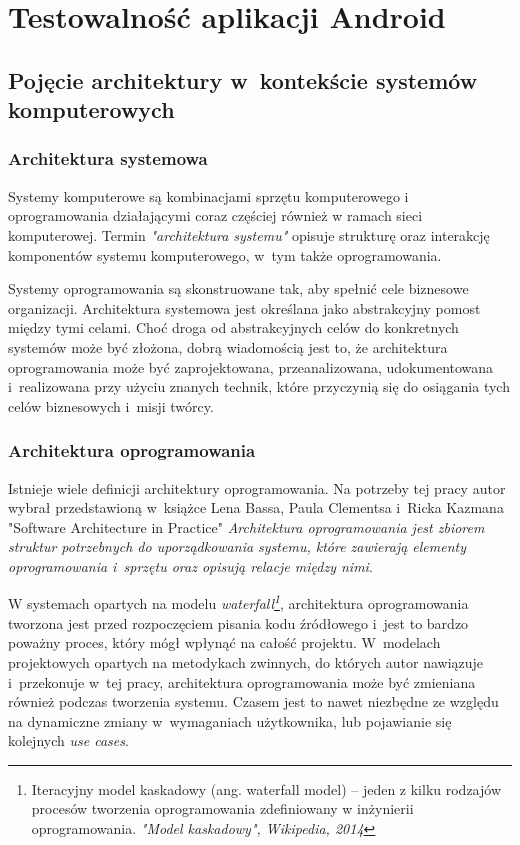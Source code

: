 \chapter{Testowalność aplikacji Android}
\label{opis_problemu}

\section{Pojęcie architektury w~kontekście systemów \newline komputerowych}
\subsection{Architektura systemowa}
Systemy komputerowe są kombinacjami sprzętu komputerowego i oprogramowania działającymi coraz częściej również w ramach sieci komputerowej. Termin \textit{"architektura systemu"} opisuje strukturę oraz interakcję komponentów systemu komputerowego, w~tym także oprogramowania.

Systemy oprogramowania są skonstruowane tak, aby spełnić cele biznesowe organizacji. Architektura systemowa jest określana jako abstrakcyjny pomost między tymi celami. Choć droga od abstrakcyjnych celów do konkretnych systemów może być złożona, dobrą wiadomością jest to, że architektura oprogramowania może być zaprojektowana, przeanalizowana, udokumentowana i~realizowana przy użyciu znanych technik, które przyczynią się do osiągania tych celów biznesowych i~misji twórcy. 


\subsection{Architektura oprogramowania}
Istnieje wiele definicji architektury oprogramowania. Na potrzeby tej pracy autor wybrał przedstawioną w~książce Lena Bassa, Paula Clementsa i~Ricka Kazmana "Software Architecture in Practice"\cite{bib:architect:software} \textit{Architektura oprogramowania jest zbiorem struktur potrzebnych do uporządkowania systemu, które zawierają elementy oprogramowania i~sprzętu oraz opisują relacje między nimi}. 

W systemach opartych na modelu \textit{waterfall\footnote{Iteracyjny model kaskadowy (ang. waterfall model) – jeden z kilku rodzajów procesów tworzenia oprogramowania zdefiniowany w inżynierii oprogramowania. \textit{"Model kaskadowy", Wikipedia, 2014}}}, architektura oprogramowania tworzona jest przed rozpoczęciem pisania kodu źródłowego i~jest to bardzo poważny proces, który mógł wpłynąć na całość projektu. W~modelach projektowych opartych na metodykach zwinnych, do których autor nawiązuje i~przekonuje w~tej pracy, architektura oprogramowania może być zmieniana również podczas tworzenia systemu. Czasem jest to nawet niezbędne ze względu na dynamiczne zmiany w~wymaganiach użytkownika, lub pojawianie się kolejnych \textit{use cases}.

